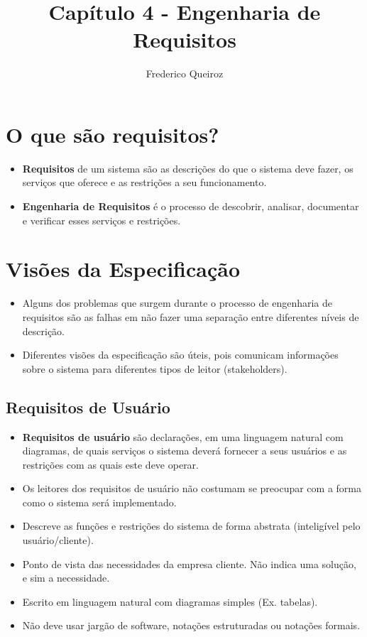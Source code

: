 \documentclass[a4paper, 11pt]{article}
\author{Frederico Queiroz}
\title{Capítulo 4 - Engenharia de Requisitos}
\begin{document}
\maketitle

\section{O que são requisitos?}
\begin{itemize}
    \item \textbf{Requisitos} de um sistema são as descrições do que o sistema deve fazer, os serviços que oferece e as restrições a seu funcionamento.
    \item \textbf{Engenharia de Requisitos} é o processo de descobrir, analisar, documentar e verificar esses serviços e restrições. 
\end{itemize}

\section{Visões da Especificação}
\begin{itemize}
    \item Alguns dos problemas que surgem durante o processo de engenharia de requisitos são as falhas em não fazer uma separação entre diferentes níveis de descrição.
    \item Diferentes visões da especificação são úteis, pois comunicam informações sobre o sistema para diferentes tipos de leitor (stakeholders).
\end{itemize}

\subsection{Requisitos de Usuário}
\begin{itemize}
    \item \textbf{Requisitos de usuário} são declarações, em uma linguagem natural com diagramas, de quais serviços o sistema deverá fornecer a seus usuários
    e as restrições com as quais este deve operar.
    \item Os leitores dos requisitos de usuário não costumam se preocupar com a forma como o sistema será implementado.
    \item Descreve as funções e restrições do sistema de forma abstrata (inteligível pelo usuário/cliente).
    \item Ponto de vista das necessidades da empresa cliente. Não indica uma solução, e sim a necessidade.
    \item Escrito em linguagem natural com diagramas simples (Ex. tabelas).
	\item Não deve usar jargão de software, notações estruturadas ou notações formais. 
\end{itemize}
\end{document}
